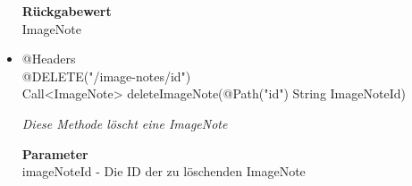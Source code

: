 \documentclass[a4paper]{scrreprt}
\begin{document}
\begin{itemize}
        		\textbf{Rückgabewert} \\
                ImageNote
                
                     \item{@Headers\\ @DELETE("/image-notes/{id}")\\Call<ImageNote> deleteImageNote(@Path("id") String ImageNoteId)}
        	
      	 	 	\textit{Diese Methode löscht eine ImageNote}
        	
        		\textbf{Parameter} \\
        		 imageNoteId - Die ID der zu löschenden ImageNote  
        	        		       	
       		 \end{itemize}
             
             
\end{document}
